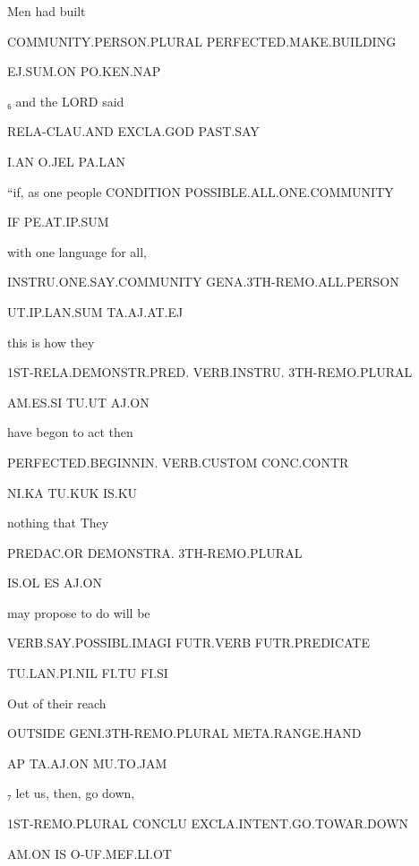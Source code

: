 { 

Men				had built 

COMMUNITY.PERSON.PLURAL	PERFECTED.MAKE.BUILDING 

EJ.SUM.ON			PO.KEN.NAP 

  

₆ and 			the LORD            said 

RELA-CLAU.AND              EXCLA.GOD	PAST.SAY 

I.AN			O.JEL		PA.LAN 

  

“if, 			as one people 				CONDITION	POSSIBLE.ALL.ONE.COMMUNITY		 

IF			PE.AT.IP.SUM				 

 

with one language 		for all, 

INSTRU.ONE.SAY.COMMUNITY	GENA.3TH-REMO.ALL.PERSON	 

UT.IP.LAN.SUM			TA.AJ.AT.EJ 

 

this is 				how       	they  

1ST-RELA.DEMONSTR.PRED.	VERB.INSTRU.    3TH-REMO.PLURAL 

AM.ES.SI			TU.UT		AJ.ON 

  

have begon 			to act		then 		 

PERFECTED.BEGINNIN.                 VERB.CUSTOM	CONC.CONTR	 

NI.KA				TU.KUK		IS.KU                     

nothing 	that		They 	 

PREDAC.OR	DEMONSTRA.	3TH-REMO.PLURAL 

IS.OL		ES		AJ.ON	 

 

may propose			to do		will be 

VERB.SAY.POSSIBL.IMAGI	FUTR.VERB	FUTR.PREDICATE 

TU.LAN.PI.NIL		               FI.TU		FI.SI 

  

Out 		of their 				reach 

OUTSIDE	GENI.3TH-REMO.PLURAL	META.RANGE.HAND 

AP		TA.AJ.ON			MU.TO.JAM 

  

₇ let us, then, go down, 			      	 

1ST-REMO.PLURAL CONCLU EXCLA.INTENT.GO.TOWAR.DOWN             

AM.ON	IS	 O-UF.MEF.LI.OT				 

}
